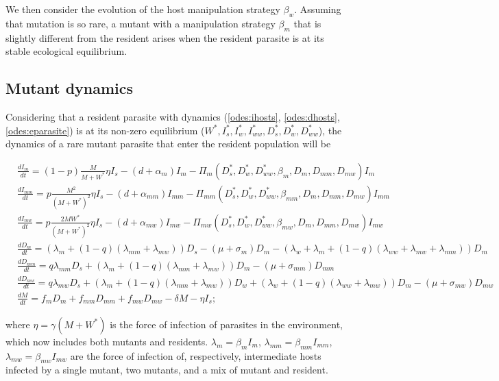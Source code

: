 \documentclass{article}
\begin{document}
We then consider the evolution of the host manipulation strategy $\beta_w$. Assuming that mutation is so rare, a mutant with a manipulation strategy $\beta_m$ that is slightly different from the resident arises when the resident parasite is at its stable ecological equilibrium.

\subsection{Mutant dynamics}
Considering that a resident parasite with dynamics (\ref{odes:ihosts}, \ref{odes:dhosts}, \ref{odes:eparasite}) is at its non-zero equilibrium ($W^*, I_s^*, I_w^*, I_{ww}^*, D_s^*, D_w^*, D_{ww}^*$), the dynamics of a rare mutant parasite that enter the resident population will be

\begin{subequations}
\begin{align}
& \frac{dI_m}{dt} = (1 - p) \frac{M}{M + W^*} \eta I_s - (d + \alpha_m) I_m -\Pi_m(D_s^*, D_w^*,  D_{ww}^*,  \beta_m, D_m, D_{mm}, D_{mw}) I_m \\
& \frac{dI_{mm}}{dt} = p \frac{M^2}{(M + W^*)^2} \eta I_s - (d + \alpha_{mm}) I_{mm} - \Pi_{mm}(D_s^*, D_w^*, D_{ww}^*, \beta_{mm}, D_m, D_{mm}, D_{mw}) I_{mm}\\
& \frac{dI_{mw}}{dt} =  p \frac{2 M W^*}{(M + W^*)^2} \eta I_s - (d + \alpha_{mw}) I_{mw} -\Pi_{mw}(D_s^*, D_w^*, D_{ww}^*, \beta_{mw}, D_m, D_{mm}, D_{mw}) I_{mw} \\
& \frac{dD_m}{dt} = ( \lambda_m + (1 - q) (\lambda_{mm} + \lambda_{mw})) D_s - (\mu + \sigma_m) D_m - (\lambda_w + \lambda_m + (1 - q) (\lambda_{ww} + \lambda_{mw} + \lambda_{mm}) ) D_m \\
& \frac{dD_{mm}}{dt} = q \lambda_{mm} D_s + (\lambda_m + (1 - q)(\lambda_{mm} + \lambda_{mw})) D_m - (\mu + \sigma_{mm}) D_{mm} \\
& \frac{dD_{mw}}{dt} = q \lambda_{mw} D_s + (\lambda_m + (1 - q)(\lambda_{mm} + \lambda_{mw})) D_w + (\lambda_w + (1 - q) (\lambda_{ww} + \lambda_{mw})) D_m - (\mu + \sigma_{mw}) D_{mw} \\
& \frac{dM}{dt} = f_m D_m + f_{mm} D_{mm} +  f_{mw} D_{mw} - \delta M - \eta I_s;
\end{align}
\label{odes:mutdynamics}
\end{subequations}

where $\eta =\gamma (M + W^*)$ is the force of infection of parasites in the environment, which now includes both mutants and residents. $\lambda_m = \beta_m I_m$, $\lambda_{mm} = \beta_{mm} I_{mm}$, $\lambda_{mw} = \beta_{mw} I_{mw}$ are the force of infection of, respectively, intermediate hosts infected by a single mutant, two mutants, and a mix of mutant and resident. 
\end{document}
